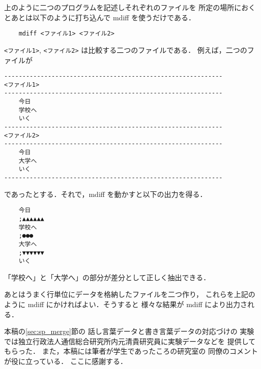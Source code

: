 上のように二つのプログラムを記述しそれぞれのファイルを
所定の場所におくとあとは以下のように打ち込んで
mdiff を使うだけである．
\begin{verbatim}
    mdiff <ファイル1> <ファイル2>
\end{verbatim}
\verb+<ファイル1>+, \verb+<ファイル2>+ は比較する二つのファイルである．
例えば，二つのファイルが
\begin{verbatim}
------------------------------------------------------------
<ファイル1>
------------------------------------------------------------
    今日
    学校へ
    いく
------------------------------------------------------------
<ファイル2>
------------------------------------------------------------
    今日
    大学へ
    いく
------------------------------------------------------------
\end{verbatim}
であったとする．それで，mdiff を動かすと以下の出力を得る．
\begin{verbatim}
    今日
    ;▲▲▲▲▲▲
    学校へ
    ;●●●
    大学へ
    ;▼▼▼▼▼▼
    いく
\end{verbatim}
「学校へ」と「大学へ」の部分が差分として正しく抽出できる．

あとはうまく行単位にデータを格納したファイルを二つ作り，
これらを上記のように mdiff にかければよい．そうすると
様々な結果が mdiff により出力される．

\acknowledgment

本稿の\ref{sec:sp_merge}節の
話し言葉データと書き言葉データの対応づけの
実験では独立行政法人通信総合研究所内元清貴研究員に実験データなどを
提供してもらった．
また，本稿には筆者が学生であったころの研究室の
同僚のコメントが役に立っている．
ここに感謝する．



